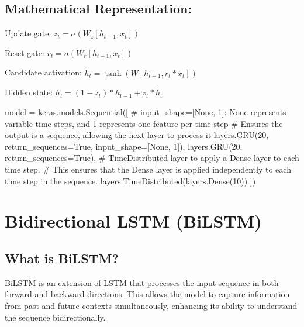 \documentclass[
  letterpaper,
  DIV=11,
  numbers=noendperiod]{scrreprt}
\newenvironment{Shaded}{\begin{snugshade}}{\end{snugshade}}
\newcommand{\CommentTok}[1]{\textcolor[rgb]{0.37,0.37,0.37}{#1}}
\newcommand{\DecValTok}[1]{\textcolor[rgb]{0.68,0.00,0.00}{#1}}
\newcommand{\NormalTok}[1]{\textcolor[rgb]{0.00,0.23,0.31}{#1}}
\newcommand{\OperatorTok}[1]{\textcolor[rgb]{0.37,0.37,0.37}{#1}}
\newcommand{\VariableTok}[1]{\textcolor[rgb]{0.07,0.07,0.07}{#1}}
\begin{document}
\subsection{Mathematical
Representation:}\label{mathematical-representation-2}

Update gate: \(z_t = \sigma(W_z[h_{t-1}, x_t])\)

Reset gate: \(r_t = \sigma(W_r[h_{t-1}, x_t])\)

Candidate activation: \(\tilde{h}_t = \tanh(W[h_{t-1}, r_t * x_t])\)

Hidden state: \(h_t = (1 - z_t) * h_{t-1} + z_t * \tilde{h}_t\)

\begin{Shaded}
\begin{Highlighting}[]
\NormalTok{model }\OperatorTok{=}\NormalTok{ keras.models.Sequential([}
    \CommentTok{\# input\_shape=[None, 1]: \textquotesingle{}None\textquotesingle{} represents variable time steps, and \textquotesingle{}1\textquotesingle{} represents one feature per time step}
    \CommentTok{\# Ensures the output is a sequence, allowing the next layer to process it}
\NormalTok{    layers.GRU(}\DecValTok{20}\NormalTok{, return\_sequences}\OperatorTok{=}\VariableTok{True}\NormalTok{, input\_shape}\OperatorTok{=}\NormalTok{[}\VariableTok{None}\NormalTok{, }\DecValTok{1}\NormalTok{]),}
\NormalTok{    layers.GRU(}\DecValTok{20}\NormalTok{, return\_sequences}\OperatorTok{=}\VariableTok{True}\NormalTok{),}
    \CommentTok{\# TimeDistributed layer to apply a Dense layer to each time step.}
    \CommentTok{\# This ensures that the Dense layer is applied independently to each time step in the sequence.}
\NormalTok{    layers.TimeDistributed(layers.Dense(}\DecValTok{10}\NormalTok{))}
\NormalTok{])}
\end{Highlighting}
\end{Shaded}

\section{Bidirectional LSTM (BiLSTM)}\label{bidirectional-lstm-bilstm}

\subsection{What is BiLSTM?}\label{what-is-bilstm}

BiLSTM is an extension of LSTM that processes the input sequence in both
forward and backward directions. This allows the model to capture
information from past and future contexts simultaneously, enhancing its
ability to understand the sequence bidirectionally.
\end{document}
